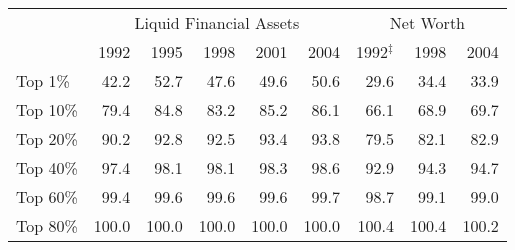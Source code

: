 \begin{center}

\begin{tabular}{lrrrrrrrr}
\toprule
& \multicolumn{5}{c}{Liquid Financial Assets} &  \multicolumn{3}{c}{Net Worth} \\
\cmidrule(r){2-6}\cmidrule(r){3-6}\cmidrule(r){7-9}
& 1992 & 1995 & 1998 & 2001 & 2004 & 1992$^{\ddagger}$ &
1998 & 2004 \\ \midrule
Top 1\%  &  42.2  & 52.7 &  47.6 &  49.6 &  50.6 &   29.6 &  34.4 &  33.9 \\
Top 10\% &  79.4  & 84.8 &  83.2 &  85.2 &  86.1 &   66.1 &  68.9 &  69.7 \\
Top 20\% &  90.2  & 92.8 &  92.5 &  93.4 &  93.8 &   79.5 &  82.1 &  82.9 \\
Top 40\% &  97.4  & 98.1 &  98.1 &  98.3 &  98.6 &   92.9 &  94.3 &  94.7 \\
Top 60\% &  99.4  & 99.6 &  99.6 &  99.6 &  99.7 &   98.7 &  99.1 &  99.0 \\
Top 80\% & 100.0 & 100.0 & 100.0 & 100.0 & 100.0 &  100.4 & 100.4 & 100.2 \\ \bottomrule
\end{tabular}

\end{center} 

